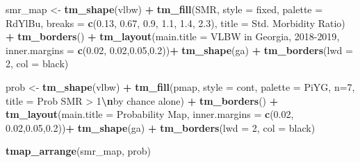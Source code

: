 \documentclass[
]{book}
\newenvironment{Shaded}{\begin{snugshade}}{\end{snugshade}}
\newcommand{\AttributeTok}[1]{\textcolor[rgb]{0.13,0.29,0.53}{#1}}
\newcommand{\DecValTok}[1]{\textcolor[rgb]{0.00,0.00,0.81}{#1}}
\newcommand{\FloatTok}[1]{\textcolor[rgb]{0.00,0.00,0.81}{#1}}
\newcommand{\FunctionTok}[1]{\textcolor[rgb]{0.13,0.29,0.53}{\textbf{#1}}}
\newcommand{\NormalTok}[1]{#1}
\newcommand{\OtherTok}[1]{\textcolor[rgb]{0.56,0.35,0.01}{#1}}
\newcommand{\SpecialCharTok}[1]{\textcolor[rgb]{0.81,0.36,0.00}{\textbf{#1}}}
\newcommand{\StringTok}[1]{\textcolor[rgb]{0.31,0.60,0.02}{#1}}
\begin{document}
\begin{Shaded}
\begin{Highlighting}[]
\NormalTok{smr\_map }\OtherTok{\textless{}{-}} \FunctionTok{tm\_shape}\NormalTok{(vlbw) }\SpecialCharTok{+}
  \FunctionTok{tm\_fill}\NormalTok{(}\StringTok{\textquotesingle{}SMR\textquotesingle{}}\NormalTok{,}
          \AttributeTok{style =} \StringTok{\textquotesingle{}fixed\textquotesingle{}}\NormalTok{, }
          \AttributeTok{palette =} \StringTok{\textquotesingle{}{-}RdYlBu\textquotesingle{}}\NormalTok{,}
          \AttributeTok{breaks =} \FunctionTok{c}\NormalTok{(}\FloatTok{0.13}\NormalTok{, }\FloatTok{0.67}\NormalTok{, }\FloatTok{0.9}\NormalTok{, }\FloatTok{1.1}\NormalTok{, }\FloatTok{1.4}\NormalTok{, }\FloatTok{2.3}\NormalTok{),}
          \AttributeTok{title =} \StringTok{\textquotesingle{}Std. Morbidity Ratio\textquotesingle{}}\NormalTok{) }\SpecialCharTok{+} 
  \FunctionTok{tm\_borders}\NormalTok{() }\SpecialCharTok{+}
  \FunctionTok{tm\_layout}\NormalTok{(}\AttributeTok{main.title =} \StringTok{\textquotesingle{}VLBW in Georgia, 2018{-}2019\textquotesingle{}}\NormalTok{,}
            \AttributeTok{inner.margins =} \FunctionTok{c}\NormalTok{(}\FloatTok{0.02}\NormalTok{, }\FloatTok{0.02}\NormalTok{,}\FloatTok{0.05}\NormalTok{,}\FloatTok{0.2}\NormalTok{))}\SpecialCharTok{+}
  \FunctionTok{tm\_shape}\NormalTok{(ga) }\SpecialCharTok{+}
  \FunctionTok{tm\_borders}\NormalTok{(}\AttributeTok{lwd =} \DecValTok{2}\NormalTok{, }\AttributeTok{col =} \StringTok{\textquotesingle{}black\textquotesingle{}}\NormalTok{)}

\NormalTok{prob }\OtherTok{\textless{}{-}} \FunctionTok{tm\_shape}\NormalTok{(vlbw) }\SpecialCharTok{+} 
  \FunctionTok{tm\_fill}\NormalTok{(}\StringTok{\textquotesingle{}pmap\textquotesingle{}}\NormalTok{,}
          \AttributeTok{style =} \StringTok{\textquotesingle{}cont\textquotesingle{}}\NormalTok{,}
          \AttributeTok{palette =} \StringTok{\textquotesingle{}PiYG\textquotesingle{}}\NormalTok{,}
          \AttributeTok{n=}\DecValTok{7}\NormalTok{,}
          \AttributeTok{title =} \StringTok{\textquotesingle{}Prob SMR \textgreater{} 1}\SpecialCharTok{\textbackslash{}n}\StringTok{by chance alone\textquotesingle{}}\NormalTok{) }\SpecialCharTok{+} 
  \FunctionTok{tm\_borders}\NormalTok{() }\SpecialCharTok{+} 
  \FunctionTok{tm\_layout}\NormalTok{(}\AttributeTok{main.title =} \StringTok{\textquotesingle{}Probability Map\textquotesingle{}}\NormalTok{,}
            \AttributeTok{inner.margins =} \FunctionTok{c}\NormalTok{(}\FloatTok{0.02}\NormalTok{, }\FloatTok{0.02}\NormalTok{,}\FloatTok{0.05}\NormalTok{,}\FloatTok{0.2}\NormalTok{))}\SpecialCharTok{+}
  \FunctionTok{tm\_shape}\NormalTok{(ga) }\SpecialCharTok{+}
  \FunctionTok{tm\_borders}\NormalTok{(}\AttributeTok{lwd =} \DecValTok{2}\NormalTok{, }\AttributeTok{col =} \StringTok{\textquotesingle{}black\textquotesingle{}}\NormalTok{)}

\FunctionTok{tmap\_arrange}\NormalTok{(smr\_map, prob)}
\end{Highlighting}
\end{Shaded}
\end{document}
